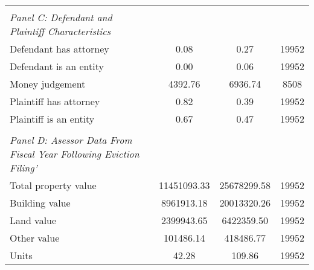\begin{table}[htbp]
\begin{tabular}{l*{1}{ccc}}
\vspace{0.1em} \\ \emph{Panel C: Defendant and Plaintiff Characteristics}&            &            &            \\
\hspace{0.25cm}Defendant has attorney&        0.08&        0.27&       19952\\
\hspace{0.25cm}Defendant is an entity&        0.00&        0.06&       19952\\
\hspace{0.25cm}Money judgement&     4392.76&     6936.74&        8508\\
\hspace{0.25cm}Plaintiff has attorney&        0.82&        0.39&       19952\\
\hspace{0.25cm}Plaintiff is an entity&        0.67&        0.47&       19952\\
\vspace{0.1em} \\ \emph{Panel D: Asessor Data From Fiscal Year Following Eviction Filing'}&            &            &            \\
\hspace{0.25cm}Total property value& 11451093.33& 25678299.58&       19952\\
\hspace{0.25cm}Building value&  8961913.18& 20013320.26&       19952\\
\hspace{0.25cm}Land value&  2399943.65&  6422359.50&       19952\\
\hspace{0.25cm}Other value&   101486.14&   418486.77&       19952\\
\hspace{0.25cm}Units&       42.28&      109.86&       19952\\
\bottomrule
\end{tabular}
\end{table}
